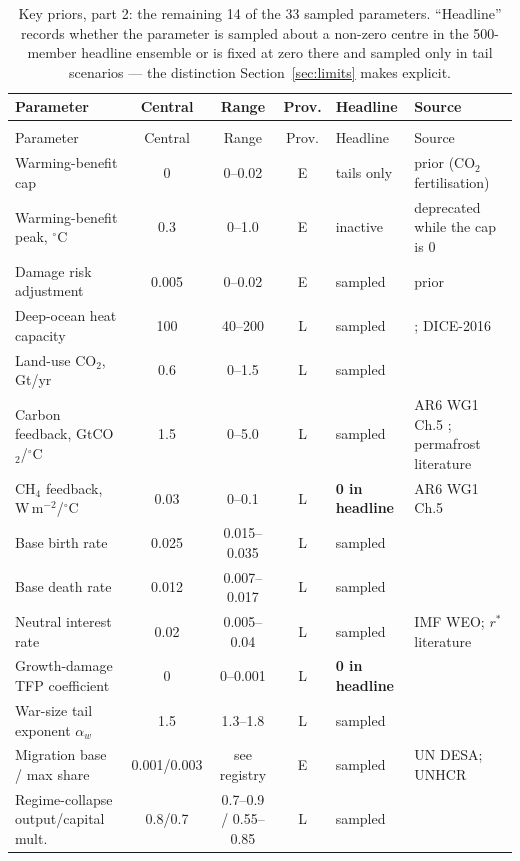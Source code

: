 \documentclass[12pt,a4paper]{article}
\newcommand{\degC}{$^{\circ}$C}
\begin{document}
\begingroup\small
\setlength{\LTcapwidth}{\linewidth}
\begin{xltabular}{\linewidth}{@{}>{\raggedright\arraybackslash}p{4.0cm}ccc>{\raggedright\arraybackslash}p{1.6cm}L@{}}
\caption{Key priors, part 2: the remaining 14 of the 33 sampled parameters. ``Headline''
records whether the parameter is sampled about a non-zero centre in the 500-member headline
ensemble or is fixed at zero there and sampled only in tail scenarios --- the distinction
Section~\ref{sec:limits} makes explicit.}\label{tab:priors2}\\
\toprule
Parameter & Central & Range & Prov. & Headline & Source \\
\midrule
\endfirsthead
{}\\
\toprule
Parameter & Central & Range & Prov. & Headline & Source \\
\midrule
\endhead
\bottomrule
\endlastfoot

Warming-benefit cap & 0 & 0--0.02 & E & tails only & prior (CO$_2$ fertilisation) \\
Warming-benefit peak, \degC & 0.3 & 0--1.0 & E & inactive & deprecated while the cap is 0 \\
Damage risk adjustment & 0.005 & 0--0.02 & E & sampled & prior \\
Deep-ocean heat capacity & 100 & 40--200 & L & sampled & \citep{geoffroy2013}; DICE-2016 \citep{nordhaus2018} \\
Land-use CO$_2$, Gt/yr & 0.6 & 0--1.5 & L & sampled & \citep{friedlingstein2023} \\
Carbon feedback, GtCO$_2$/\degC & 1.5 & 0--5.0 & L & sampled & AR6 WG1 Ch.5 \citep{ipcc_ar6_wg1}; permafrost literature \\
CH$_4$ feedback, W\,m$^{-2}$/\degC & 0.03 & 0--0.1 & L & \textbf{0 in headline} & AR6 WG1 Ch.5 \citep{ipcc_ar6_wg1} \\
Base birth rate & 0.025 & 0.015--0.035 & L & sampled & \citep{worldbank_wdi} \\
Base death rate & 0.012 & 0.007--0.017 & L & sampled & \citep{worldbank_wdi} \\
Neutral interest rate & 0.02 & 0.005--0.04 & L & sampled & IMF WEO; $r^*$ literature \\
Growth-damage TFP coefficient & 0 & 0--0.001 & L & \textbf{0 in headline} & \citep{burke2015} \\
War-size tail exponent $\alpha_w$ & 1.5 & 1.3--1.8 & L & sampled & \citep{richardson1948,clauset2009} \\
Migration base / max share & 0.001/0.003 & see registry & E & sampled & UN DESA; UNHCR \\
Regime-collapse output/capital mult. & 0.8/0.7 & 0.7--0.9 / 0.55--0.85 & L & sampled & \citep{barro2008} \\
\end{xltabular}
\endgroup
\end{document}
